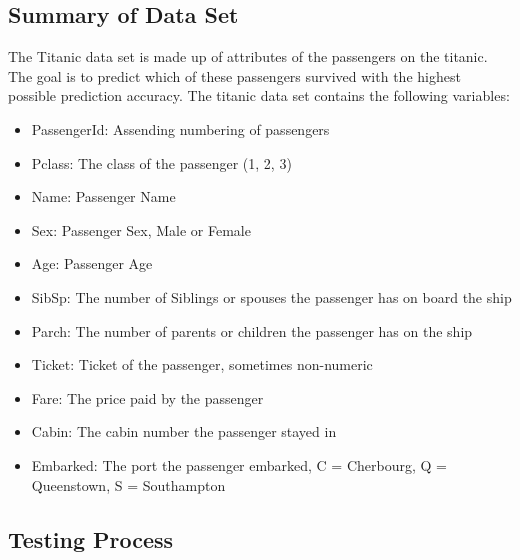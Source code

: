 \documentclass{article}
\begin{document}
\newpage
\subsection{Summary of Data Set}

The Titanic data set is made up of attributes of the passengers on the titanic. The goal is to predict which of these passengers survived with the highest possible prediction accuracy.
The titanic data set contains the following variables:

\begin{itemize}
\item PassengerId: Assending numbering of passengers
\item Pclass: The class of the passenger (1, 2, 3)
\item Name: Passenger Name
\item Sex: Passenger Sex, Male or Female
\item Age: Passenger Age
\item SibSp: The number of Siblings or spouses the passenger has on board the ship
\item Parch: The number of parents or children the passenger has on the ship
\item Ticket: Ticket of the passenger, sometimes non-numeric
\item Fare: The price paid by the passenger
\item Cabin: The cabin number the passenger stayed in
\item Embarked: The port the passenger embarked, C = Cherbourg, Q = Queenstown, S = Southampton
\end{itemize}

\subsection{Testing Process}
\end{document}

